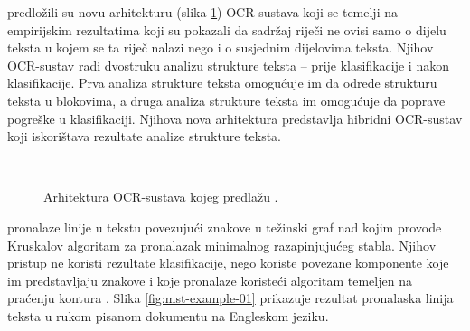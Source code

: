 \documentclass[times, utf8, zavrsni]{fer}
\begin{document}
\citep{zhu2016novel} predložili su novu arhitekturu (slika \ref{fig:novel-ocr})
OCR-sustava koji se temelji na empirijskim rezultatima koji su pokazali da
sadržaj riječi ne ovisi samo o dijelu teksta u kojem se ta riječ nalazi nego i
o susjednim dijelovima teksta. Njihov OCR-sustav radi dvostruku analizu
strukture teksta -- prije klasifikacije i nakon klasifikacije. Prva analiza
strukture teksta omogućuje im da odrede strukturu teksta u blokovima, a druga
analiza strukture teksta im omogućuje da poprave pogreške u klasifikaciji.
Njihova nova arhitektura predstavlja hibridni OCR-sustav koji iskorištava
rezultate analize strukture teksta.

\

\begin{figure}[htb]
    \centering
    \captionsetup{justification=centering}
    \caption{Arhitektura OCR-sustava kojeg predlažu \citep{zhu2016novel}.}
    \label{fig:novel-ocr}
\end{figure}

\pagebreak

\citep{yin2007handwritten} pronalaze linije u tekstu povezujući znakove u
težinski graf nad kojim provode Kruskalov algoritam za pronalazak minimalnog
razapinjujućeg stabla. Njihov pristup ne koristi rezultate klasifikacije, nego
koriste povezane komponente koje im predstavljaju znakove i koje pronalaze
koristeći algoritam temeljen na praćenju kontura . Slika
\ref{fig:mst-example-01} prikazuje rezultat pronalaska linija teksta u rukom
pisanom dokumentu na Engleskom jeziku.

\
\end{document}

